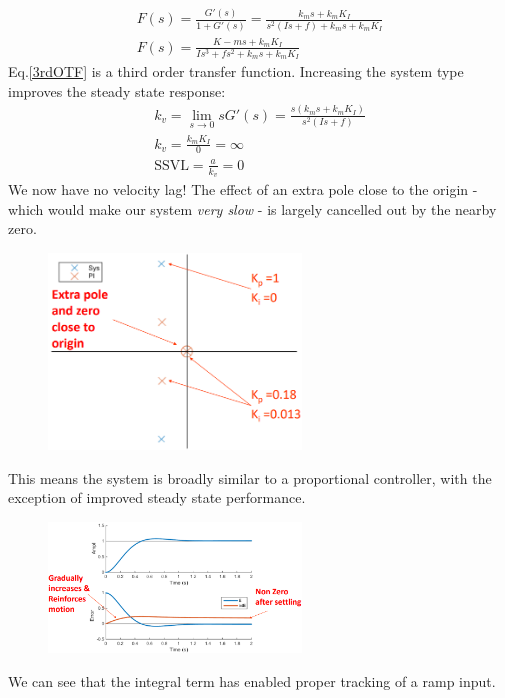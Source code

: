 \documentclass[class=report, crop=false, 12pt,a4paper]{standalone}
\begin{document}
\begin{gather}
  F(s) = \frac{G'(s)}{1 + G'(s)} = \frac{k_m s + k_m K_I}{s^2 \left( Is + f\right) + k_m s +k_m K_I}\\
  F(s) = \frac{K-m s + k_m K_I}{Is^3 + fs^2 + k_m s + k_m K_I} \label{3rdOTF}
\end{gather}
Eq.\ref{3rdOTF} is a third order transfer function. Increasing the system type improves the steady state response:
\begin{gather}
  k_v = \lim_{s\rightarrow 0} sG'(s) = \frac{s\left( k_m s + k_m K_I \right)}{s^2 \left( Is + f \right)}\\
  k_v = \frac{k_m K_I}{0} = \infty \\
  \textrm{SSVL} = \frac{a}{k_v} = 0
\end{gather}
We now have no velocity lag! The effect of an extra pole close to the origin - which would make our system \textit{very slow} - is largely cancelled out by the nearby zero. 
\begin{figure}[H]
  \centerline{\includegraphics[width = 0.6\textwidth]{../img/diagram128.png}}
  \caption{}
\end{figure}
This means the system is broadly similar to a proportional controller, with the exception of improved steady state performance.
\begin{figure}[H]
  \centerline{\includegraphics[width = 0.6\textwidth]{../img/diagram129.png}}
  \caption{}
\end{figure}
We can see that the integral term has enabled proper tracking of a ramp input.
\end{document}
